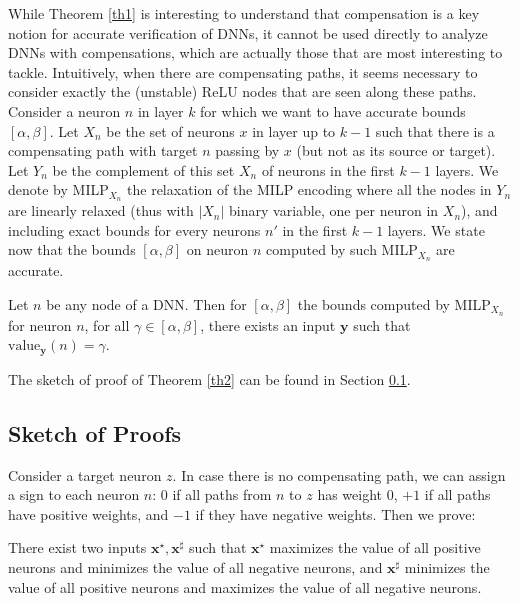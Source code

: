 \documentclass{llncs}
\newcommand{\vx}{\boldsymbol{x}}
\newcommand{\vy}{\boldsymbol{y}}
\newcommand{\val}{{\textrm{value}}}
\begin{document}
While Theorem \ref{th1} is interesting to understand that compensation is a key notion for accurate verification of DNNs, it cannot be used directly to analyze DNNs with compensations, which are actually those that are most interesting to tackle.
Intuitively, when there are compensating paths, it seems necessary to consider exactly the (unstable) ReLU nodes that are seen along these paths. 
Consider a neuron $n$ in layer $k$ for which we want to have accurate bounds 
$[\alpha,\beta]$.
Let $X_n$ be the set of neurons $x$ in layer up to $k-1$ such that there is a compensating path with target $n$ passing by $x$ (but not as its source or target). Let $Y_n$ be the complement of this set $X_n$ of neurons in the first $k-1$ layers. We denote by MILP$_{X_n}$ the relaxation of the MILP encoding where all the nodes in $Y_n$ are linearly relaxed (thus with $|X_n|$ binary variable, one per neuron in $X_n$), and including exact bounds for every neurons $n'$ in the first $k-1$ layers. We state now that the bounds $[\alpha,\beta]$ on neuron $n$ computed by such MILP$_{X_n}$ are accurate.

\begin{theorem}
	\label{th2} 
	Let $n$ be any node of a DNN. Then for $[\alpha,\beta]$ the bounds computed by MILP$_{X_n}$ for neuron $n$, for all $\gamma \in [\alpha,\beta]$, there exists an input $\vy$ such that $\val_{\vy}(n)=\gamma$.
\end{theorem}

The sketch of proof of Theorem \ref{th2} can be found in Section \ref{sec.proofs}.


\subsection{Sketch of Proofs}
\label{sec.proofs}

Consider a target neuron $z$.
In case there is no compensating path, we can assign a sign to each neuron $n$: 0
if all paths from $n$ to $z$ has weight 0, $+1$ if all paths have positive weights, and 
$-1$ if they have negative weights. Then we prove:

\begin{proposition}
	\label{prop.sign}
	There exist two inputs $\vx^\star,\vx^\sharp$ such that ${\vx^\star}$ maximizes the value of all positive neurons and minimizes the value of all negative neurons, and  ${\vx^\sharp}$ minimizes the value of all positive neurons and maximizes the value of all negative neurons.
\end{proposition}
\end{document}
